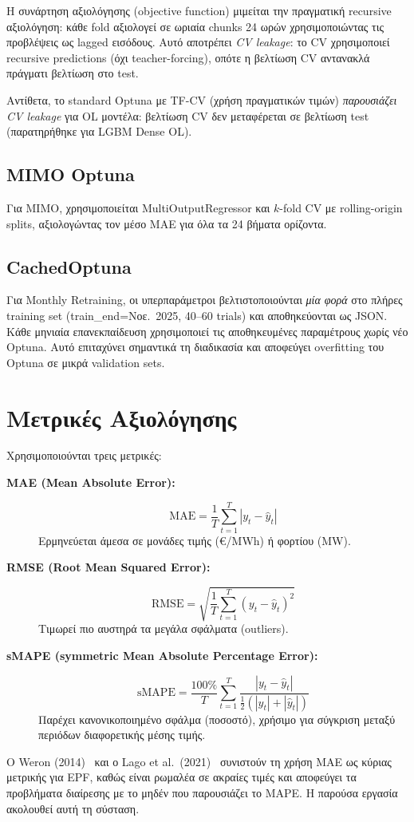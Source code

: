 Η συνάρτηση αξιολόγησης (objective function) μιμείται την πραγματική recursive αξιολόγηση:
κάθε fold αξιολογεί σε ωριαία chunks 24 ωρών χρησιμοποιώντας τις προβλέψεις ως lagged εισόδους.
Αυτό αποτρέπει \textit{CV leakage}: το CV χρησιμοποιεί recursive predictions (όχι teacher-forcing),
οπότε η βελτίωση CV αντανακλά πράγματι βελτίωση στο test.

Αντίθετα, το standard Optuna με TF-CV (χρήση πραγματικών τιμών) \textit{παρουσιάζει CV leakage}
για OL μοντέλα: βελτίωση CV δεν μεταφέρεται σε βελτίωση test (παρατηρήθηκε για LGBM Dense OL).

\subsection{MIMO Optuna}

Για MIMO, χρησιμοποιείται MultiOutputRegressor και $k$-fold CV με rolling-origin splits,
αξιολογώντας τον μέσο MAE για όλα τα 24 βήματα ορίζοντα.

\subsection{CachedOptuna}

Για Monthly Retraining, οι υπερπαράμετροι βελτιστοποιούνται \textit{μία φορά} στο πλήρες
training set (train\_end=Νοε.\ 2025, 40--60 trials) και αποθηκεύονται ως JSON. Κάθε μηνιαία
επανεκπαίδευση χρησιμοποιεί τις αποθηκευμένες παραμέτρους χωρίς νέο Optuna. Αυτό επιταχύνει
σημαντικά τη διαδικασία και αποφεύγει overfitting του Optuna σε μικρά validation sets.


\section{Μετρικές Αξιολόγησης}
\label{sec:metrics}

Χρησιμοποιούνται τρεις μετρικές:

\begin{description}
    \item[\textbf{MAE (Mean Absolute Error):}]
    \begin{equation}
        \text{MAE} = \frac{1}{T} \sum_{t=1}^{T} |y_t - \hat{y}_t|
    \end{equation}
    Ερμηνεύεται άμεσα σε μονάδες τιμής (€/MWh) ή φορτίου (MW).

    \item[\textbf{RMSE (Root Mean Squared Error):}]
    \begin{equation}
        \text{RMSE} = \sqrt{\frac{1}{T} \sum_{t=1}^{T} (y_t - \hat{y}_t)^2}
    \end{equation}
    Τιμωρεί πιο αυστηρά τα μεγάλα σφάλματα (outliers).

    \item[\textbf{sMAPE (symmetric Mean Absolute Percentage Error):}]
    \begin{equation}
        \text{sMAPE} = \frac{100\%}{T} \sum_{t=1}^{T}
        \frac{|y_t - \hat{y}_t|}{\frac{1}{2}(|y_t| + |\hat{y}_t|)}
    \end{equation}
    Παρέχει κανονικοποιημένο σφάλμα (ποσοστό), χρήσιμο για σύγκριση μεταξύ περιόδων
    διαφορετικής μέσης τιμής.
\end{description}

Ο Weron (2014)~\cite{weron2014electricity} και ο Lago et al.\ (2021)~\cite{lago2021} συνιστούν τη
χρήση MAE ως κύριας μετρικής για EPF, καθώς είναι ρωμαλέα σε ακραίες τιμές και αποφεύγει τα
προβλήματα διαίρεσης με το μηδέν που παρουσιάζει το MAPE. Η παρούσα εργασία ακολουθεί αυτή τη
σύσταση.
